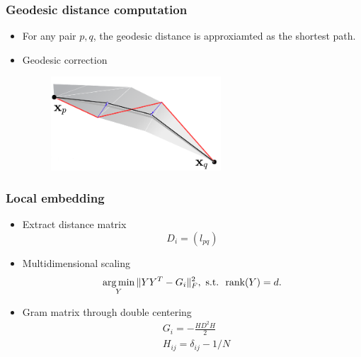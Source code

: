 \documentclass[serif,mathserif, 12pt]{beamer}
\newcommand{\argmin}{\operatornamewithlimits{arg\min}}
\begin{document}
\begin{frame}
  \frametitle{Geodesic distance computation}
  \begin{itemize}
  \item For any pair $p, q$, the geodesic distance is approxiamted as
    the shortest path.
  \item Geodesic correction
    \begin{figure}
      \centering
      \includegraphics[width=0.6\textwidth]{img/geodesic_correction}       
    \end{figure}
  \end{itemize}
\end{frame}

\begin{frame}
  \frametitle{Local embedding}
  \begin{itemize}
  \item Extract distance matrix
    \begin{equation*}
      D_i = (l_{pq})
    \end{equation*}
  \item Multidimensional scaling
    \begin{equation*}
     \argmin_Y \|YY^T-G_i\|_F^2, \text{~s.t.~~rank}(Y) = d.
    \end{equation*}
  \item Gram matrix through double centering
    \begin{equation*}
      \begin{split}
        &G_i = -\frac{HD^2H}{2} \\
        &H_{ij} = \delta_{ij}-1/N
      \end{split}
    \end{equation*}
  \end{itemize}
\end{frame}
\end{document}
